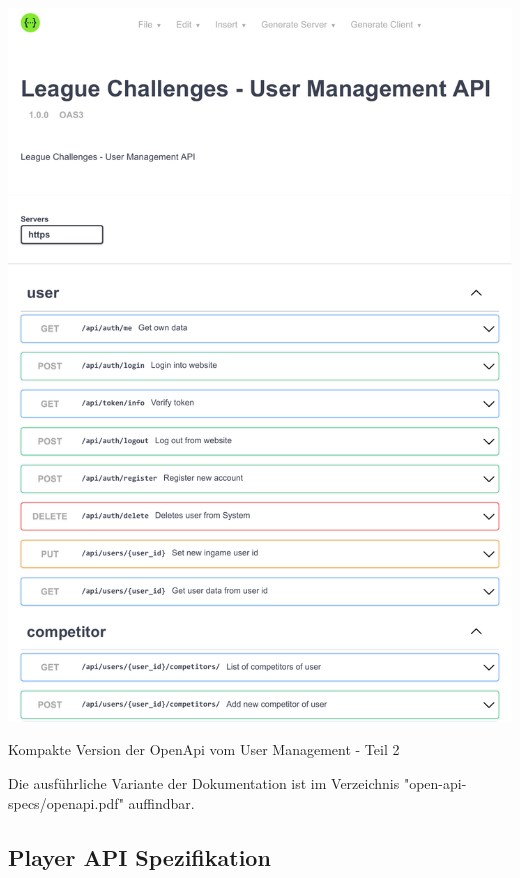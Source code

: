 \begin{center}
  \includegraphics[width=1\textwidth, page=2]{images/pdfs/openapi-short.pdf}
  \caption{Kompakte Version der OpenApi vom User Management - Teil 2}
  \label{fig:compact_user_openapi_2}
\end{center}

Die ausführliche Variante der Dokumentation ist im Verzeichnis "open-api-specs/openapi.pdf" auffindbar.

\subsection{Player API Spezifikation}

